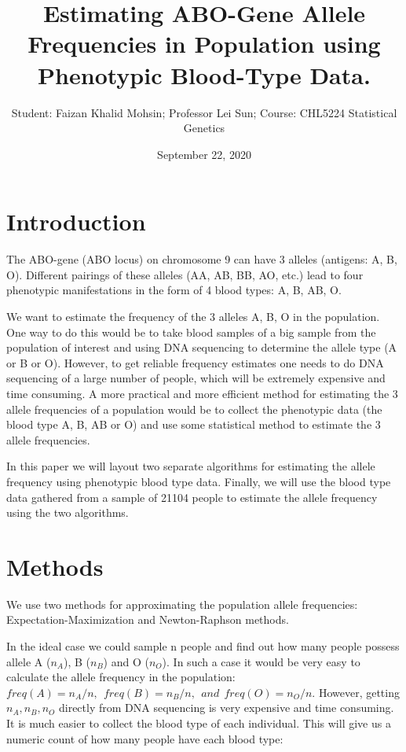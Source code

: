 \documentclass[]{article}
\title{Estimating ABO-Gene Allele Frequencies in Population using Phenotypic
Blood-Type Data.}
\author{Student: Faizan Khalid Mohsin; Professor Lei Sun; Course: CHL5224
Statistical Genetics}
\date{September 22, 2020}
\begin{document}
\maketitle

\section{Introduction}\label{introduction}

The ABO-gene (ABO locus) on chromosome 9 can have 3 alleles (antigens:
A, B, O). Different pairings of these alleles (AA, AB, BB, AO, etc.)
lead to four phenotypic manifestations in the form of 4 blood types: A,
B, AB, O.

We want to estimate the frequency of the 3 alleles A, B, O in the
population. One way to do this would be to take blood samples of a big
sample from the population of interest and using DNA sequencing to
determine the allele type (A or B or O). However, to get reliable
frequency estimates one needs to do DNA sequencing of a large number of
people, which will be extremely expensive and time consuming. A more
practical and more efficient method for estimating the 3 allele
frequencies of a population would be to collect the phenotypic data (the
blood type A, B, AB or O) and use some statistical method to estimate
the 3 allele frequencies.

In this paper we will layout two separate algorithms for estimating the
allele frequency using phenotypic blood type data. Finally, we will use
the blood type data gathered from a sample of 21104 people to estimate
the allele frequency using the two algorithms.

\section{Methods}\label{methods}

We use two methods for approximating the population allele frequencies:
Expectation-Maximization and Newton-Raphson methods.

In the ideal case we could sample n people and find out how many people
possess allele A (\(n_A\)), B (\(n_B\)) and O (\(n_O\)). In such a case
it would be very easy to calculate the allele frequency in the
population:
\(freq(A) = n_A/n, \: \: freq(B) = n_B/n,\: \: and \: \:freq(O) = n_O/n\).
However, getting \(n_A, n_B, n_O\) directly from DNA sequencing is very
expensive and time consuming. It is much easier to collect the blood
type of each individual. This will give us a numeric count of how many
people have each blood type:
\end{document}
